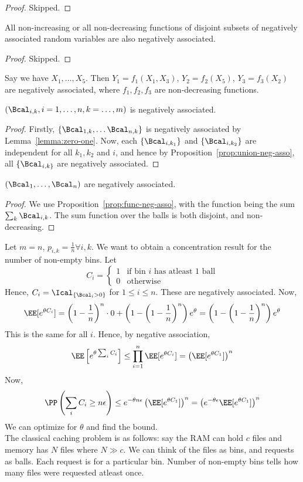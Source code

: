 \begin{proof}
Skipped.
\end{proof}
\begin{prop}\label{prop:func-neg-asso}
All non-increasing or all non-decreasing functions of disjoint subsets of negatively associated random variables are also negatively associated.
\end{prop}
\begin{proof}
Skipped.
\end{proof}
\begin{eg}
Say we have $X_1, \dots, X_5$. Then $Y_1 = f_1(X_1, X_3)$, $Y_2 = f_2(X_5)$, $Y_3 = f_3(X_2)$ are negatively associated, where $f_1, f_2, f_3$ are non-decreasing functions.
\end{eg}
\begin{prop}
$(\Bcal_{i,k}, i = 1, \dots, n, k = \dots, m)$ is negatively associated.
\end{prop}
\begin{proof}
Firstly, $\{\Bcal_{1,k}, \dots \Bcal_{n,k}\}$ is negatively associated by Lemma~\ref{lemma:zero-one}. Now, each $\{\Bcal_{i,k_1}\}$ and $\{\Bcal_{i, k_2}\}$ are independent for all $k_1, k_2$ and $i$, and hence by Proposition~\ref{prop:union-neg-asso}, all $\{\Bcal_{i,k\}}$ are negatively associated.
\end{proof}
\begin{prop}
$(\Bcal_1, \dots, \Bcal_n)$ are negatively associated.
\end{prop}
\begin{proof}
We use Proposition~\ref{prop:func-neg-asso}, with the function being the sum $\sum_k \Bcal_{i,k}$. The sum function over the balls is both disjoint, and non-decreasing.
\end{proof}
\begin{eg}
Let $m = n$, $p_{i,k} = \frac{1}{n} \forall i,k$. We want to obtain a concentration result for the number of non-empty bins. Let
\[
C_i = \begin{cases}
    1 &\text{if bin $i$ has atleast 1 ball} \\
    0 &\text{otherwise}
\end{cases}
\]
Hence, $C_i = \Ical_{\{\Bcal_i > 0\}}$ for $1 \leq i \leq n$. These are negatively associated. Now,
\[
\EE[e^{\theta C_i}] = \left(1 - \frac{1}{n}\right)^n \cdot 0 + \left(1 - \left(1-\frac1n\right)^n\right)e^\theta = \left(1 - \left(1-\frac1n\right)^n\right)e^\theta 
\]
This is the same for all $i$. Hence, by negative association,
\[
\EE\left[e^{\theta \sum_i C_i}\right] \leq \prod_{i=1}^n \EE[e^{\theta C_i}] = \left(\EE[e^{\theta C_1}]\right)^n
\]
Now, 
\[
\PP\left(\sum_i C_i \geq n\epsilon\right) \leq e^{-\theta n \epsilon}\left(\EE[e^{\theta C_1}]\right)^n =\left(e^{-\theta \epsilon}\EE[e^{\theta C_1}]\right)^n 
\]
We can optimize for $\theta$ and find the bound. \\
The classical caching problem is as follows: say the RAM can hold $c$ files and memory has $N$ files where $N \gg c$. We can think of the files as bins, and requests as balls. Each request is for a particular bin. Number of non-empty bins tells how many files were requested atleast once.
\end{eg}
